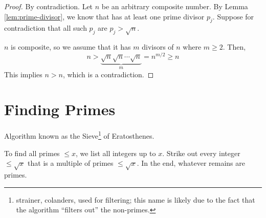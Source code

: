 \begin{proof}
    By contradiction. Let $n$ be an arbitrary composite number. By Lemma \ref{lem:prime-divisor}, we know that  has at least one prime divisor $p_j$. Suppose for contradiction that all such $p_j$ are $p_j > \sqrt{n}$.

    $n$ is composite, so we assume that it has $m$ divisors of $n$ where $m \geq 2$. Then,
    $$
    n > \underbrace{\sqrt{n} \sqrt{n} \cdots \sqrt{n}}_{m} = n^{m/2} \geq n
    $$
    This implies $n > n$, which is a contradiction.
\end{proof}

\section{Finding Primes}

Algorithm known as the Sieve\footnote{strainer, colanders, used for filtering; this name is likely due to the fact that the algorithm ``filters out'' the non-primes.} of Eratosthenes.

To find all primes $\leq x$, we list all integers up to $x$. Strike out every integer $\leq \sqrt{x}$ that is a multiple of primes $\leq \sqrt{x}$. In the end, whatever remains are primes.

